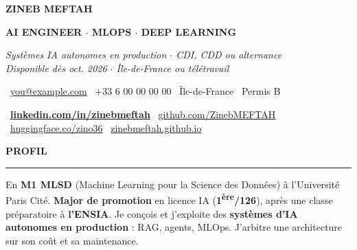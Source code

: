 \documentclass[10pt, a4paper]{article}
\newcommand{\headfont}{\sffamily}
\newlength{\mainInner}\setlength{\mainInner}{\textwidth}
\providecommand{\cvFit}{1.0}
\newlength{\cvgap}
\newcommand{\vgap}[1]{\setlength{\cvgap}{#1}\vspace{\cvFit\cvgap}}
\newcommand{\mainSection}[1]{%
  \vgap{6pt}%
  {\headfont\color{sectionColor}\fontsize{10pt}{11.5pt}\selectfont\bfseries\MakeUppercase{#1}}\par%
  \nointerlineskip\vgap{2pt}%
  {\color{ruleColor}\rule{\mainInner}{0.8pt}}\par\vgap{4pt}%
}
\newcommand{\ic}[1]{\makebox[4.2mm][l]{\color{gold}#1}\ }
\begin{document}
\begin{lrbox}{\cvMainBox}%
\begin{minipage}[t]{\mainInner}

  {\headfont\fontsize{27pt}{30pt}\selectfont\bfseries ZINEB MEFTAH}\par\vspace{5pt}
  {\headfont\color{accent}\fontsize{12.5pt}{16pt}\selectfont\bfseries
    AI ENGINEER {\color{mutedText}$\cdot$} MLOPS {\color{mutedText}$\cdot$} DEEP LEARNING}\par\vspace{3pt}
  {\color{subtitleColor}\fontsize{9.5pt}{13pt}\selectfont\itshape
    Systèmes IA autonomes en production $\cdot$ CDI, CDD ou alternance\\
    Disponible dès oct. 2026 $\cdot$ Île-de-France ou télétravail}\par\vspace{5pt}

  {\fontsize{9pt}{13pt}\selectfont
    \ic{\faEnvelope}\href{mailto:you@example.com}{you@example.com}\hfill
    \ic{\faPhone}+33 6 00 00 00 00\hfill
    \ic{\faMapMarker}Île-de-France\hfill
    \ic{\faCar}Permis B\par\vspace{2pt}
    \ic{\faLinkedin}\textbf{\href{https://www.linkedin.com/in/zinebmeftah}{linkedin.com/in/zinebmeftah}}\hfill
    \ic{\faGithub}\href{https://github.com/ZinebMEFTAH}{github.com/ZinebMEFTAH}\hfill
    \ic{\faRobot}\href{https://huggingface.co/zino36}{huggingface.co/zino36}\hfill
    \ic{\faGlobe}\href{https://zinebmeftah.github.io}{zinebmeftah.github.io}\par
  }
  \vgap{4pt}

  \mainSection{Profil}
  {\fontsize{9pt}{12.5pt}\selectfont
En \textbf{M1 MLSD} (Machine Learning pour la Science des Données) à l'Université Paris Cité. \textbf{Major de promotion} en licence IA (\textbf{1\textsuperscript{ère}/126}), après une classe préparatoire à \textbf{l'ENSIA}. Je conçois et j'exploite des \textbf{systèmes d'IA autonomes en production} : RAG, agents, MLOps. J'arbitre une architecture sur son coût et sa maintenance.
  }
  \vspace{5pt}


\end{minipage}
\end{lrbox}
\end{document}
